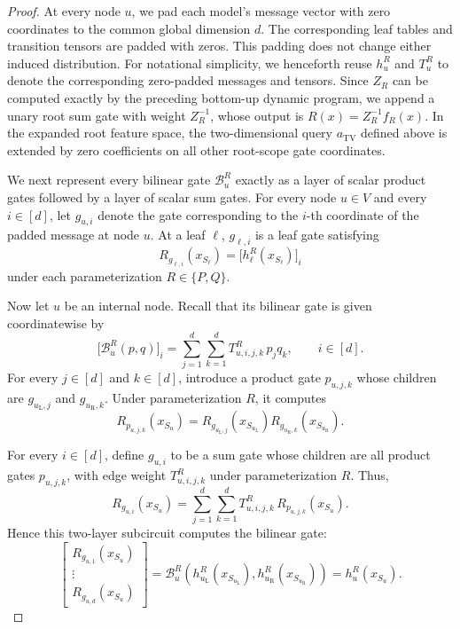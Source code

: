 \documentclass[10pt,a4paper]{amsart}
\begin{document}
\begin{proof}
At every node $u$, we pad each model's message vector with zero coordinates to the common global dimension $d$. The corresponding leaf tables and transition tensors are padded with zeros. This padding does not change either induced distribution. For notational simplicity, we henceforth reuse $h_u^R$ and $T_u^R$ to denote the corresponding zero-padded messages and tensors. Since $Z_R$ can be computed exactly by the preceding bottom-up dynamic program, we append a unary root sum gate with weight $Z_R^{-1}$, whose output is $R(x)=Z_R^{-1}f_R(x)$. In the expanded root feature space, the two-dimensional query $a_{\mathrm{TV}}$ defined above is extended by zero coefficients on all other root-scope gate coordinates.

We next represent every bilinear gate $\mathcal B_u^R$ exactly as a layer of scalar product gates followed by a layer of scalar sum gates. For every node $u\in V$ and every $i\in[d]$, let $g_{u,i}$ denote the gate corresponding to the $i$-th coordinate of the padded message at node $u$. At a leaf $\ell$, $g_{\ell,i}$ is a leaf gate satisfying
$$
R_{g_{\ell,i}}(x_{S_\ell}) = \bigl[h_\ell^R(x_{S_\ell})\bigr]_i
$$
under each parameterization $R\in\{P,Q\}$.

Now let $u$ be an internal node. Recall that its bilinear gate is given coordinatewise by
$$
\bigl[\mathcal B_u^R(p,q)\bigr]_i = \sum_{j=1}^{d}\sum_{k=1}^{d} T_{u,i,j,k}^R\,p_jq_k, \qquad i\in[d].
$$
For every $j\in[d]$ and $k\in[d]$, introduce a product gate $p_{u,j,k}$ whose children are $g_{u_{\mathrm L},j}$ and $g_{u_{\mathrm R},k}$. Under parameterization $R$, it computes
$$
R_{p_{u,j,k}}(x_{S_u}) = R_{g_{u_{\mathrm L},j}}(x_{S_{u_{\mathrm L}}}) R_{g_{u_{\mathrm R},k}}(x_{S_{u_{\mathrm R}}}).
$$

For every $i\in[d]$, define $g_{u,i}$ to be a sum gate whose children are all product gates $p_{u,j,k}$, with edge weight $T_{u,i,j,k}^R$ under parameterization $R$. Thus,
$$
R_{g_{u,i}}(x_{S_u}) = \sum_{j=1}^{d}\sum_{k=1}^{d} T_{u,i,j,k}^R\, R_{p_{u,j,k}}(x_{S_u}).
$$
Hence this two-layer subcircuit computes the bilinear gate:
$$
\begin{bmatrix} R_{g_{u,1}}(x_{S_u})\\ \vdots\\ R_{g_{u,d}}(x_{S_u}) \end{bmatrix} = \mathcal B_u^R\!\left(h_{u_{\mathrm L}}^R(x_{S_{u_{\mathrm L}}}), h_{u_{\mathrm R}}^R(x_{S_{u_{\mathrm R}}})\right) = h_u^R(x_{S_u}).
$$


\end{proof}
\end{document}
